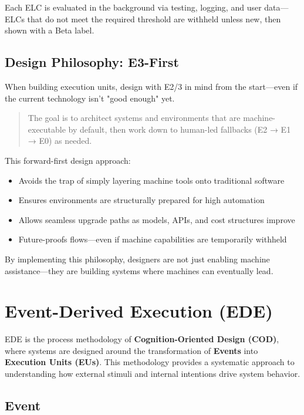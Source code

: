 \documentclass[12pt,a4paper]{article}
\newcommand{\cod}{\textbf{Cognition-Oriented Design (COD)}}
\begin{document}
Each ELC is evaluated in the background via testing, logging, and user data—ELCs that do not meet the required threshold are withheld unless new, then shown with a Beta label.

\subsection{Design Philosophy: E3-First}

When building execution units, design with E2/3 in mind from the start—even if the current technology isn't "good enough" yet.

\begin{quote}
The goal is to architect systems and environments that are machine-executable by default, then work down to human-led fallbacks (E2 → E1 → E0) as needed.
\end{quote}

This forward-first design approach:

\begin{itemize}
\item Avoids the trap of simply layering machine tools onto traditional software
\item Ensures environments are structurally prepared for high automation
\item Allows seamless upgrade paths as models, APIs, and cost structures improve
\item Future-proofs flows—even if machine capabilities are temporarily withheld
\end{itemize}

By implementing this philosophy, designers are not just enabling machine assistance—they are building systems where machines can eventually lead.

\section{Event-Derived Execution (EDE)}

EDE is the process methodology of \cod, where systems are designed around the transformation of \textbf{Events} into \textbf{Execution Units (EUs)}. This methodology provides a systematic approach to understanding how external stimuli and internal intentions drive system behavior.

\subsection{Event}
\end{document}
